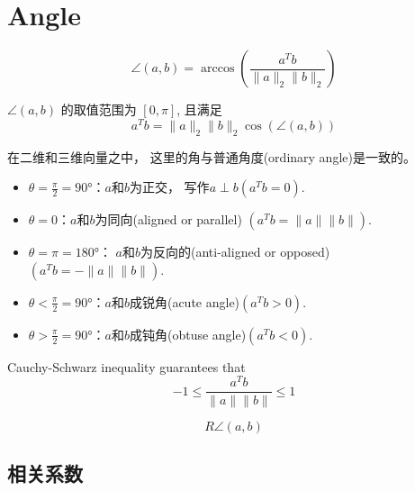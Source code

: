 \section{Angle}

\begin{definition}
    \begin{equation} \angle(a, b)=\arccos \left(\frac{a^{T} b}{\|a\|_{2}\|b\|_{2}}\right) \end{equation}

    $ \angle(a, b) $ 的取值范围为 $ [0, \pi] $, 且满足\begin{equation} a^{T} b=\|a\|_{2}\|b\|_{2} \cos (\angle(a, b)) \end{equation}
\end{definition}

在二维和三维向量之中， 这里的角与普通角度(ordinary angle)是一致的。 

\begin{itemize}
    \item $\theta =\frac{\pi}{2}=90°$：$a$和$b$为正交， 写作$a \perp b (a ^T b  =0)$. 
    \item $\theta =0$：$a$和$b$为同向(aligned or parallel) $(a ^T  b=\| a \| \| b  \| )$. 
    \item $\theta =\pi =180°$： $a$和$b$为反向的(anti-aligned or opposed)$(a ^T   b  = - \| a \| \| b \| )$. 
    \item $\theta <\frac{\pi}{2}=90°$：$a$和$b$成锐角(acute angle)$(a ^T b >0)$. 
    \item $\theta >\frac{\pi}{2}=90°$：$a$和$b$成钝角(obtuse angle)$(a ^T b <0)$. 
\end{itemize}

\begin{theorem}
    Cauchy-Schwarz inequality guarantees that
\begin{equation}
-1 \leq \frac{a^{T} b}{\|a\|\|b\|} \leq 1
\end{equation}
\end{theorem}

\begin{definition}[球面的距离]
    \begin{equation}  {R} \angle(a, b) \end{equation}
\end{definition}

\subsection{相关系数}

